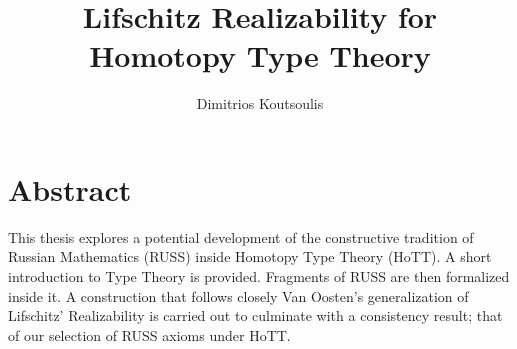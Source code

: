\documentclass[12pt]{report}
\theoremstyle{definition}
\begin{document}
 
\title{Lifschitz Realizability for Homotopy Type Theory}%
\author{Dimitrios Koutsoulis} %

{\parskip=0pt
\maketitle}
\chapter*{Abstract}
This thesis explores a potential development of the constructive tradition of Russian Mathematics (RUSS) inside Homotopy Type Theory (HoTT). 
A short introduction to Type Theory is provided. 
Fragments of RUSS are then formalized inside it. 
A construction that follows closely Van Oosten's generalization of Lifschitz' Realizability is carried out to culminate with a consistency result; that of our selection of RUSS axioms under HoTT. 

\tableofcontents
\end{document}

